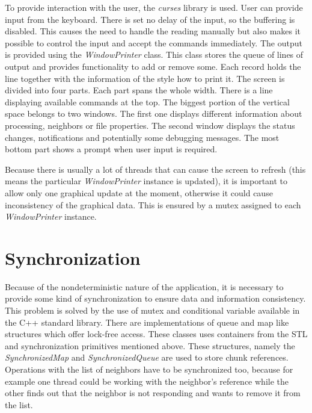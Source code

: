 To provide interaction with the user, the \textit{curses} library is
used. User can provide input from the keyboard. There is set no delay of
the input, so the buffering is disabled. This causes the need to handle
the reading manually but also makes it possible to control the input and
accept the commands immediately. The output is provided using the
\textit{WindowPrinter} class. This class stores the queue of lines of
output and provides functionality to add or remove some. Each record
holds the line together with the information of the style how to print
it. The screen is divided into four parts. Each part spans the whole
width. There is a line displaying available commands at the top. The
biggest portion of the vertical space belongs to two windows. The first
one displays different information about processing, neighbors or file
properties. The second window displays the status changes, notifications
and potentially some debugging messages. The most bottom part shows a
prompt when user input is required.

Because there is usually a lot of threads that can cause the screen to
refresh (this means the particular \textit{WindowPrinter} instance is
updated), it is important to allow only one graphical update at the
moment, otherwise it could cause inconsistency of the graphical data.
This is ensured by a mutex assigned to each \textit{WindowPrinter}
instance.

\section{Synchronization}\label{synchronization}

Because of the nondeterministic nature of the application, it is
necessary to provide some kind of synchronization to ensure data and
information consistency. This problem is solved by the use of mutex and
conditional variable available in the C++ standard library. There are
implementations of queue and map like structures which offer lock-free
access. These classes uses containers from the STL and synchronization
primitives mentioned above. These structures, namely the
\textit{SynchronizedMap} and \textit{SynchronizedQueue} are used to
store chunk references. Operations with the list of neighbors have to be
synchronized too, because for example one thread could be working with
the neighbor's reference while the other finds out that the neighbor is
not responding and wants to remove it from the list.

